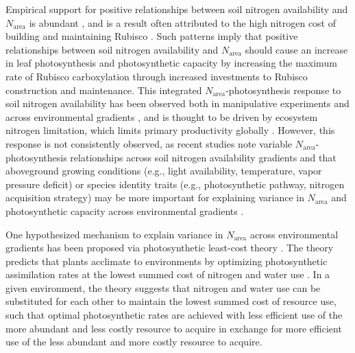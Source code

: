 Empirical support for positive relationships between soil nitrogen availability and $N_\mathrm{area}$ is abundant , and is a result often attributed to the high nitrogen cost of building and maintaining Rubisco . Such patterns imply that positive relationships between soil nitrogen availability and $N_\mathrm{area}$ should cause an increase in leaf photosynthesis and photosynthetic capacity by increasing the maximum rate of Rubisco carboxylation through increased investments to Rubisco construction and maintenance. This integrated $N_\mathrm{area}$-photosynthesis response to soil nitrogen availability has been observed both in manipulative experiments and across environmental gradients , and is thought to be driven by ecosystem nitrogen limitation, which limits primary productivity globally . However, this response is not consistently observed, as recent studies note variable $N_\mathrm{area}$-photosynthesis relationships across soil nitrogen availability gradients  and that aboveground growing conditions (e.g., light availability, temperature, vapor pressure deficit) or species identity traits (e.g., photosynthetic pathway, nitrogen acquisition strategy) may be more important for explaining variance in $N_\mathrm{area}$ and photosynthetic capacity across environmental gradients .

One hypothesized mechanism to explain variance in $N_\mathrm{area}$ across environmental gradients has been proposed via photosynthetic least-cost theory . The theory predicts that plants acclimate to environments by optimizing photosynthetic assimilation rates at the lowest summed cost of nitrogen and water use . In a given environment, the theory suggests that nitrogen and water use can be substituted for each other to maintain the lowest summed cost of resource use, such that optimal photosynthetic rates are achieved with less efficient use of the more abundant and less costly resource to acquire in exchange for more efficient use of the less abundant and more costly resource to acquire.

